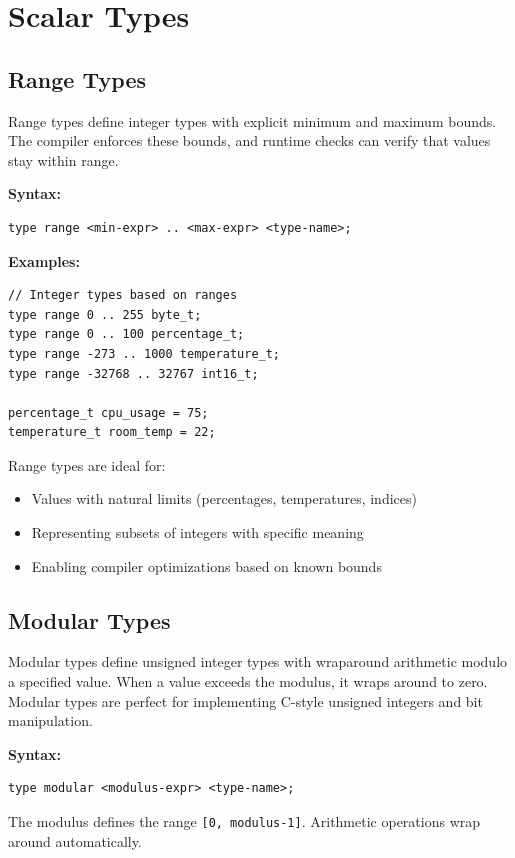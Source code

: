 \documentclass[11pt,letterpaper,twoside,openany]{book}
\begin{document}
\section{Scalar Types}

\subsection{Range Types}

Range types define integer types with explicit minimum and maximum bounds. The compiler enforces these bounds, and runtime checks can verify that values stay within range.

\textbf{Syntax:}
\begin{lstlisting}
type range <min-expr> .. <max-expr> <type-name>;
\end{lstlisting}

\textbf{Examples:}
\begin{lstlisting}
// Integer types based on ranges
type range 0 .. 255 byte_t;
type range 0 .. 100 percentage_t;
type range -273 .. 1000 temperature_t;
type range -32768 .. 32767 int16_t;

percentage_t cpu_usage = 75;
temperature_t room_temp = 22;
\end{lstlisting}

Range types are ideal for:
\begin{itemize}
\item Values with natural limits (percentages, temperatures, indices)
\item Representing subsets of integers with specific meaning
\item Enabling compiler optimizations based on known bounds
\end{itemize}

\subsection{Modular Types}

Modular types define unsigned integer types with wraparound arithmetic modulo a specified value. When a value exceeds the modulus, it wraps around to zero. Modular types are perfect for implementing C-style unsigned integers and bit manipulation.

\textbf{Syntax:}
\begin{lstlisting}
type modular <modulus-expr> <type-name>;
\end{lstlisting}

The modulus defines the range \verb'[0, modulus-1]'. Arithmetic operations wrap around automatically.
\end{document}
